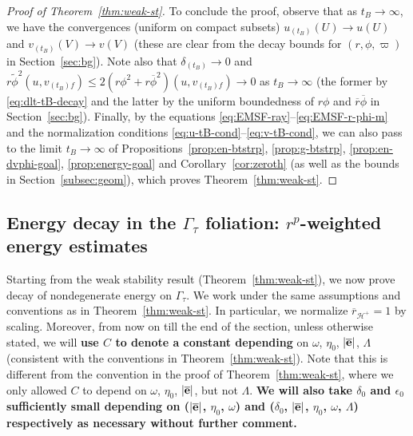 \documentclass[10pt, reqno]{amsart}
\theoremstyle{definition}
\theoremstyle{remark}
\theoremstyle{conjecture}
\numberwithin{equation}{section}
\newcommand{\0}{\emptyset}
\newcommand{\Gmm}{\Gamma}
\newcommand{\dlt}{\delta}
\newcommand{\eps}{\epsilon}
\newcommand{\Lmb}{\Lambda}
\newcommand{\omg}{\omega}
\newcommand{\bfe}{{\bf e}}
\newcommand{\calH}{\mathcal H}
\newcommand{\EH}{\calH^{+}}
\newcommand{\e}{\bfe}							%
\newcommand{\phibg}{\overline{\phi}}				%
\newcommand{\rbg}{\overline{r}}					%
\newcommand{\ebg}{\overline{\e}}					%
\newcommand{\phidf}{\widetilde{\phi}}				%
\begin{document}
\begin{proof}[Proof of Theorem~\ref{thm:weak-st}]
To conclude the proof, observe that as $t_{B} \to \infty$, we have the convergences (uniform on compact subsets) $u_{(t_{B})} (U) \to u(U)$ and $v_{(t_{B})}(V) \to v(V)$ (these are clear from the decay bounds for $(r, \phi, \varpi)$ in Section~\ref{sec:bg}). Note also that $\dlt_{(t_{B})} \to 0$ and $r \phidf^{2}(u, v_{(t_{B}) f}) \leq 2 (r \phi^{2} + r \phibg^{2})(u, v_{(t_{B}) f}) \to 0$ as $t_{B} \to \infty$ (the former by \eqref{eq:dlt-tB-decay} and the latter by the uniform boundedness of $r \phi$ and $\rbg \phibg$ in Section~\ref{sec:bg}). Finally, by the equations \eqref{eq:EMSF-ray}--\eqref{eq:EMSF-r-phi-m} and the normalization conditions \eqref{eq:u-tB-cond}--\eqref{eq:v-tB-cond}, we can also pass to the limit $t_{B} \to \infty$ of Propositions~\ref{prop:en-btstrp}, \ref{prop:g-btstrp}, \ref{prop:en-dvphi-goal}, \ref{prop:energy-goal} and Corollary~\ref{cor:zeroth} (as well as the bounds in Section~\ref{subsec:geom}), which proves Theorem~\ref{thm:weak-st}.  \qedhere
\end{proof}

\subsection{Energy decay in the $\Gmm_{\tau}$ foliation: $r^{p}$-weighted energy estimates} \label{subsec:rp-weight}
Starting from the weak stability result (Theorem~\ref{thm:weak-st}), we now prove decay of nondegenerate energy on $\Gmm_{\tau}$. We work under the same assumptions and conventions as in Theorem~\ref{thm:weak-st}. In particular, we normalize $\rbg_{\EH} = 1$ by scaling. Moreover, from now on till the end of the section, unless otherwise stated, we will \textbf{use $C$ to denote a constant depending} on $\omg$, $\eta_{0}$, $|\ebg|$, $\Lmb$ (consistent with the conventions in Theorem~\ref{thm:weak-st}). Note that this is different from the convention in the proof of Theorem~\ref{thm:weak-st}, where we only allowed $C$ to depend on $\omg$, $\eta_{0}$, $|\ebg|$, but not $\Lmb$. \textbf{We will also take $\dlt_{0}$ and $\eps_{0}$ sufficiently small depending on ($|\ebg|$, $\eta_0$, $\omg$) and ($\dlt_{0}$, $|\ebg|$, $\eta_0$, $\omg$, $\Lmb$) respectively as necessary without further comment.}
\end{document}
